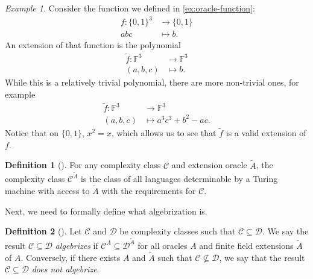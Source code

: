 \documentclass[english,12pt]{reedthesis}
\theoremstyle{plain}
\theoremstyle{definition}
\newtheorem{defn}[defn]{Definition}
\theoremstyle{remark}
\newtheorem{example}{Example}[thm]
\begin{document}
\begin{example}\label{ex:oracle-function-ext}
  Consider the function we defined in \cref{ex:oracle-function}:
  \begin{equation}
    \begin{aligned}
      f: \{0, 1\}^{3} &\rightarrow \{0, 1\} \\
      abc &\mapsto b.
    \end{aligned}
  \end{equation}
  An extension of that function is the polynomial
  \begin{equation}
    \begin{aligned}
      \tilde{f}: \mathbb{F}^{3} &\rightarrow \mathbb{F}^{3} \\
      (a,b,c) &\mapsto b.
    \end{aligned}
  \end{equation}
  While this is a relatively trivial polynomial, there are more non-trivial
  ones, for example
  \begin{equation}
    \begin{aligned}
      \tilde{f}: \mathbb{F}^{3} &\rightarrow \mathbb{F}^{3} \\
      (a,b,c) &\mapsto a^{3}c^{3} + b^{2} - ac.
    \end{aligned}
  \end{equation}
  Notice that on $\{0, 1\}$, $x^{2} = x$, which allows us to see that
  $\tilde{f}$ is a valid extension of $f$.
\end{example}


\begin{defn}[{\cite[Def.\ 2.2]{AW09}}]\label{def:ext-oracle-class}
  For any complexity class $\mathcal{C}$ and extension oracle $\tilde{A}$, the complexity
  class $\mathcal{C}^{\tilde{A}}$ is the class of all languages determinable by a Turing
  machine with access to $\tilde{A}$ with the requirements for $\mathcal{C}$.
\end{defn}

Next, we need to formally define what algebrization is.

\begin{defn}[{\cite[Def.\ 2.3]{AW09}}]\label{def:algebrization}
  Let $\mathcal{C}$ and $\mathcal{D}$ be complexity classes such that $\mathcal{C} \subseteq \mathcal{D}$. We say the result
  $\mathcal{C} \subseteq \mathcal{D}$ \emph{algebrizes} if $\mathcal{C}^{A} \subseteq \mathcal{D}^{\tilde{A}}$ for all oracles $A$ and
  finite field extensions $\tilde{A}$ of $A$. Conversely, if there exists $A$
  and $\tilde{A}$ such that $\mathcal{C} \nsubseteq \mathcal{D}$, we say that the result $\mathcal{C} \subseteq \mathcal{D}$ \emph{does
    not algebrize}.
\end{defn}
\end{document}
